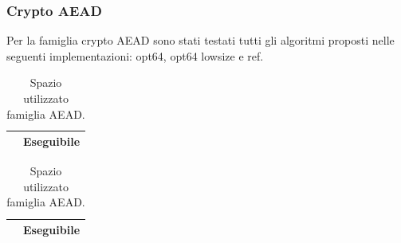 \documentclass[12pt,a4paper,italian]{report}
\begin{document}
\subsubsection{Crypto AEAD}

Per la famiglia crypto AEAD sono stati testati tutti gli algoritmi proposti nelle seguenti implementazioni: opt64, opt64 lowsize e ref.

\begin{table}[h]
    \caption{Spazio utilizzato famiglia AEAD.}
    \begin{minipage}[t]{0.5\linewidth}
        \centering
        \begin{tabular}{|c|c|}
            \hline
             & Eseguibile \\
            \hline
            \hline
        \end{tabular}
    \end{minipage}
    \begin{minipage}[t]{0.5\linewidth}
        \centering
        \begin{tabular}{|c|c|}
            \hline
             & Eseguibile \\
            \hline
            \hline
        \end{tabular}
    \end{minipage}
\end{table}
\end{document}
